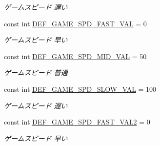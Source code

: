 \begin{DoxyCompactItemize}
\begin{DoxyCompactList}\small\item\em ゲームスピード 遅い \end{DoxyCompactList}\item 
\mbox{\label{class_reversi4color_wpf_1_1_reversi_const_acf5d7172ba31c01c11f86c614357f62d}} 
const int \hyperlink{class_reversi4color_wpf_1_1_reversi_const_acf5d7172ba31c01c11f86c614357f62d}{D\+E\+F\+\_\+\+G\+A\+M\+E\+\_\+\+S\+P\+D\+\_\+\+F\+A\+S\+T\+\_\+\+V\+AL} = 0
\begin{DoxyCompactList}\small\item\em ゲームスピード 早い \end{DoxyCompactList}\item 
\mbox{\label{class_reversi4color_wpf_1_1_reversi_const_a84f4f72020733f942ea368cababc7b32}} 
const int \hyperlink{class_reversi4color_wpf_1_1_reversi_const_a84f4f72020733f942ea368cababc7b32}{D\+E\+F\+\_\+\+G\+A\+M\+E\+\_\+\+S\+P\+D\+\_\+\+M\+I\+D\+\_\+\+V\+AL} = 50
\begin{DoxyCompactList}\small\item\em ゲームスピード 普通 \end{DoxyCompactList}\item 
\mbox{\label{class_reversi4color_wpf_1_1_reversi_const_af848108f74a61b5cd2cd22c8f6845da6}} 
const int \hyperlink{class_reversi4color_wpf_1_1_reversi_const_af848108f74a61b5cd2cd22c8f6845da6}{D\+E\+F\+\_\+\+G\+A\+M\+E\+\_\+\+S\+P\+D\+\_\+\+S\+L\+O\+W\+\_\+\+V\+AL} = 100
\begin{DoxyCompactList}\small\item\em ゲームスピード 遅い \end{DoxyCompactList}\item 
\mbox{\label{class_reversi4color_wpf_1_1_reversi_const_afa20936d05a59898fe8a02b7ac8a74d7}} 
const int \hyperlink{class_reversi4color_wpf_1_1_reversi_const_afa20936d05a59898fe8a02b7ac8a74d7}{D\+E\+F\+\_\+\+G\+A\+M\+E\+\_\+\+S\+P\+D\+\_\+\+F\+A\+S\+T\+\_\+\+V\+A\+L2} = 0
\begin{DoxyCompactList}\small\item\em ゲームスピード 早い \end{DoxyCompactList}\item 

\end{DoxyCompactItemize}
